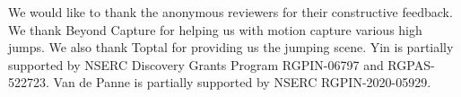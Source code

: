 \documentclass[acmtog]{acmart}
\begin{document}


%
%




\maketitle










\begin{acks}
We would like to thank the anonymous reviewers for their constructive feedback. We thank Beyond Capture for helping us with motion capture various high jumps. We also thank Toptal for providing us the jumping scene. Yin is partially supported by NSERC Discovery Grants Program RGPIN-06797 and RGPAS-522723. Van de Panne is partially supported by NSERC RGPIN-2020-05929.
\end{acks}





\end{document}
